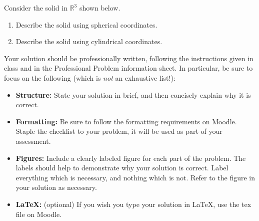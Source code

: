\begin{problem}
Consider the solid in $\mathbb{R}^3$ shown below.

\begin{image}
\end{image}

\begin{enumerate}
\item Describe the solid using spherical coordinates.
\item Describe the solid using cylindrical coordinates.
\end{enumerate}

Your solution should be professionally written, following the instructions given in class and in the Professional Problem information sheet. In particular, be sure to focus on the following (which is \emph{not} an exhaustive list!):
\begin{itemize}
	\item \textbf{Structure:} State your solution in brief, and then concisely explain why it is correct.
	\item \textbf{Formatting:} Be sure to follow the formatting requirements on Moodle. Staple the checklist to your problem, it will be used as part of your assessment.
	\item \textbf{Figures:} Include a clearly labeled figure for each part of the problem. The labels should help to demonstrate why your solution is correct. Label everything which is necessary, and nothing which is not. Refer to the figure in your solution as necessary.
	\item \textbf{\LaTeX:} (optional) If you wish you type your solution in \LaTeX, use the tex file on Moodle.
\end{itemize}
\end{problem}